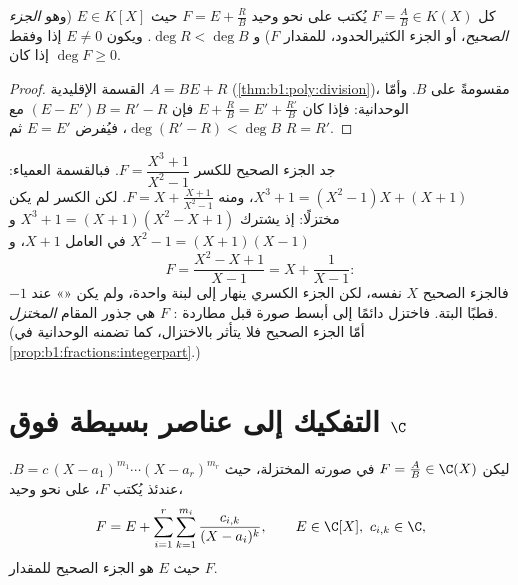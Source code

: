 \begin{proposition}\label{prop:b1:fractions:integerpart}
كل $F = \frac AB \in K(X)$ يُكتب على نحو وحيد $F = E + \frac RB$ حيث $E
\in K[X]$ (وهو \emph{الجزء الصحيح}، أو الجزء الكثيرالحدود، للمقدار $F$) و
$\deg R < \deg B$. ويكون $E \neq 0$ إذا وفقط إذا كان $\deg F \geq 0$.
\end{proposition}

\begin{proof}
القسمة الإقليدية $A = BE + R$ (\cref{thm:b1:poly:division})، مقسومةً
على $B$. وأمّا الوحدانية: فإذا كان $E + \frac RB = E' + \frac{R'}{B}$ فإن $(E -
E')B = R' - R$ مع $\deg(R' - R) < \deg B$، فيُفرض $E = E'$ ثم $R
= R'$.
\end{proof}

\begin{example}\label{ex:b1:fractions:integerpart}
جد الجزء الصحيح للكسر $F = \dfrac{X^3 + 1}{X^2 - 1}$. فبالقسمة
العمياء: $X^3 + 1 = (X^2 - 1)X + (X + 1)$، ومنه $F = X +
\frac{X + 1}{X^2 - 1}$. لكن الكسر لم يكن مختزلًا: إذ يشترك $X^3 + 1
= (X + 1)(X^2 - X + 1)$ و $X^2 - 1 = (X+1)(X-1)$ في العامل
$X + 1$، و
\[
F = \frac{X^2 - X + 1}{X - 1} = X + \frac{1}{X - 1} :
\]
فالجزء الصحيح $X$ نفسه، لكن الجزء الكسري ينهار إلى
لبنة واحدة، ولم يكن «» عند $-1$ قطبًا البتة.
فاختزل دائمًا إلى أبسط صورة قبل مطاردة : 
$F$ هي جذور المقام \emph{المختزل}. (أمّا الجزء الصحيح
فلا يتأثر بالاختزال، كما تضمنه الوحدانية في
\cref{prop:b1:fractions:integerpart}.)
\end{example}

\section{التفكيك إلى عناصر بسيطة فوق $\C$}

\begin{theorem}\label{thm:b1:fractions:complex}
ليكن $F = \frac AB \in \C(X)$ في صورته المختزلة، حيث $B = c\,(X -
a_1)^{m_1} \cdots (X - a_r)^{m_r}$. عندئذ يُكتب $F$، على نحو وحيد،
\[
F = E + \sum_{i=1}^{r} \sum_{k=1}^{m_i}
\frac{c_{i,k}}{(X - a_i)^k},
\qquad E \in \C[X],\ c_{i,k} \in \C ,
\]
حيث $E$ هو الجزء الصحيح للمقدار $F$.
\end{theorem}

